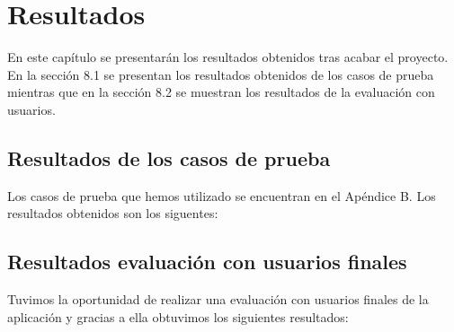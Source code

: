 
%
%

\chapter{Resultados}

\begin{resumen}
En este capítulo se presentarán los resultados obtenidos tras acabar el proyecto. En la sección 8.1 se presentan los resultados obtenidos de los casos de prueba mientras que en la sección 8.2 se muestran los resultados de la evaluación con usuarios.
\end{resumen}

\section{Resultados de los casos de prueba}
\label{cap8:sec:resultados_pruebas}

Los casos de prueba que hemos utilizado se encuentran en el Apéndice B. Los resultados obtenidos son los siguentes:

\section{Resultados evaluación con usuarios finales}
\label{cap8:sec:resultados_usuarios}

Tuvimos la oportunidad de realizar una evaluación con usuarios finales de la aplicación y gracias a ella obtuvimos los siguientes resultados: